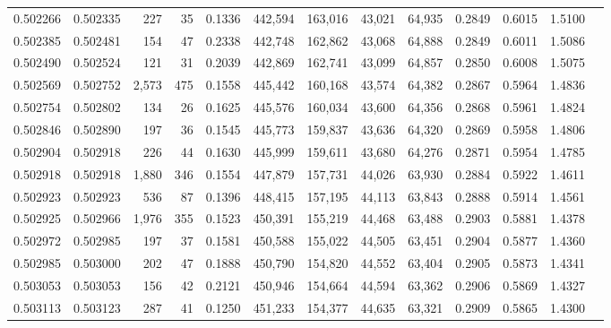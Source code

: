 \begin{tabular}{rrrrrrrrrrrrr}
0.502266 & 0.502335 &   227 &    35 &                                     0.1336 & 442,594 & 163,016 &  43,021 &  64,935 & 0.2849 & 0.6015 & 1.5100 \\
0.502385 & 0.502481 &   154 &    47 &                                     0.2338 & 442,748 & 162,862 &  43,068 &  64,888 & 0.2849 & 0.6011 & 1.5086 \\
0.502490 & 0.502524 &   121 &    31 &                                     0.2039 & 442,869 & 162,741 &  43,099 &  64,857 & 0.2850 & 0.6008 & 1.5075 \\
0.502569 & 0.502752 & 2,573 &   475 &                                     0.1558 & 445,442 & 160,168 &  43,574 &  64,382 & 0.2867 & 0.5964 & 1.4836 \\
0.502754 & 0.502802 &   134 &    26 &                                     0.1625 & 445,576 & 160,034 &  43,600 &  64,356 & 0.2868 & 0.5961 & 1.4824 \\
0.502846 & 0.502890 &   197 &    36 &                                     0.1545 & 445,773 & 159,837 &  43,636 &  64,320 & 0.2869 & 0.5958 & 1.4806 \\
0.502904 & 0.502918 &   226 &    44 &                                     0.1630 & 445,999 & 159,611 &  43,680 &  64,276 & 0.2871 & 0.5954 & 1.4785 \\
0.502918 & 0.502918 & 1,880 &   346 &                                     0.1554 & 447,879 & 157,731 &  44,026 &  63,930 & 0.2884 & 0.5922 & 1.4611 \\
0.502923 & 0.502923 &   536 &    87 &                                     0.1396 & 448,415 & 157,195 &  44,113 &  63,843 & 0.2888 & 0.5914 & 1.4561 \\
0.502925 & 0.502966 & 1,976 &   355 &                                     0.1523 & 450,391 & 155,219 &  44,468 &  63,488 & 0.2903 & 0.5881 & 1.4378 \\
0.502972 & 0.502985 &   197 &    37 &                                     0.1581 & 450,588 & 155,022 &  44,505 &  63,451 & 0.2904 & 0.5877 & 1.4360 \\
0.502985 & 0.503000 &   202 &    47 &                                     0.1888 & 450,790 & 154,820 &  44,552 &  63,404 & 0.2905 & 0.5873 & 1.4341 \\
0.503053 & 0.503053 &   156 &    42 &                                     0.2121 & 450,946 & 154,664 &  44,594 &  63,362 & 0.2906 & 0.5869 & 1.4327 \\
0.503113 & 0.503123 &   287 &    41 &                                     0.1250 & 451,233 & 154,377 &  44,635 &  63,321 & 0.2909 & 0.5865 & 1.4300 \\

\end{tabular}

